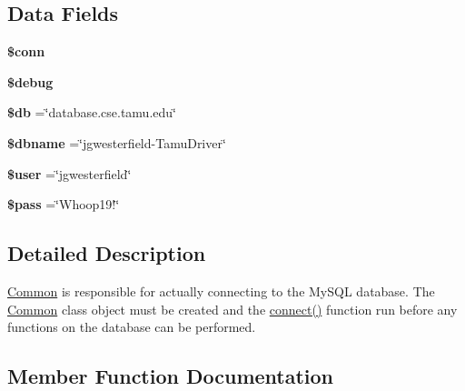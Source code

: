 \subsection*{Data Fields}
\begin{DoxyCompactItemize}
\item 
{\bfseries \$conn}\hypertarget{class_common_aa8a5a87b9c1a6a0819b88447cbe41877}{}\label{class_common_aa8a5a87b9c1a6a0819b88447cbe41877}

\item 
{\bfseries \$debug}\hypertarget{class_common_a85ae3e64cd40e9564adceb010085e9dd}{}\label{class_common_a85ae3e64cd40e9564adceb010085e9dd}

\item 
{\bfseries \$db} =\char`\"{}database.\+cse.\+tamu.\+edu\char`\"{}\hypertarget{class_common_a1fa3127fc82f96b1436d871ef02be319}{}\label{class_common_a1fa3127fc82f96b1436d871ef02be319}

\item 
{\bfseries \$dbname} =\char`\"{}jgwesterfield-\/Tamu\+Driver\char`\"{}\hypertarget{class_common_ac5111a571fffa2499732833bb7f0d8c1}{}\label{class_common_ac5111a571fffa2499732833bb7f0d8c1}

\item 
{\bfseries \$user} =\char`\"{}jgwesterfield\char`\"{}\hypertarget{class_common_a598ca4e71b15a1313ec95f0df1027ca5}{}\label{class_common_a598ca4e71b15a1313ec95f0df1027ca5}

\item 
{\bfseries \$pass} =\char`\"{}Whoop19!\char`\"{}\hypertarget{class_common_a12ec2780b52bd1c54d38c2f981c0349f}{}\label{class_common_a12ec2780b52bd1c54d38c2f981c0349f}

\end{DoxyCompactItemize}


\subsection{Detailed Description}
\hyperlink{class_common}{Common} is responsible for actually connecting to the My\+S\+QL database. The \hyperlink{class_common}{Common} class object must be created and the \hyperlink{class_common_a1b1bd9b3f45a5fbd2549355282cdc96f}{connect()} function run before any functions on the database can be performed. 

\subsection{Member Function Documentation}
